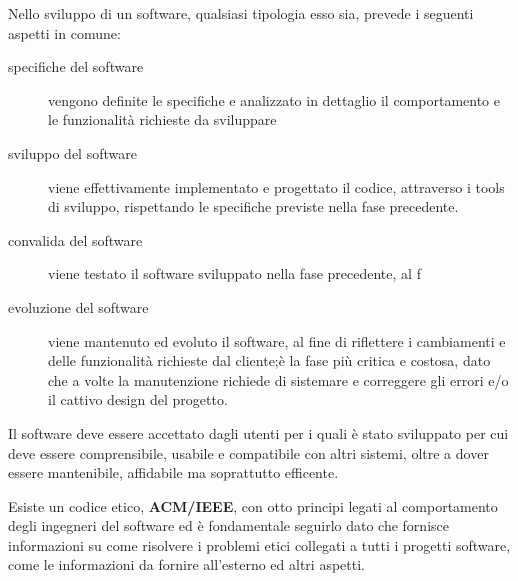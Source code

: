 \documentclass[a4paper,12pt, oneside]{book}
\begin{document}
Nello sviluppo di un software, qualsiasi tipologia esso sia, prevede i seguenti aspetti in comune:
\begin{description}
	\item [specifiche del software] vengono definite le specifiche e analizzato in dettaglio il comportamento
	      e le funzionalità richieste da sviluppare
	\item [sviluppo del software] viene effettivamente implementato e progettato il codice, attraverso i tools di sviluppo,
	      rispettando le specifiche previste nella fase precedente.
	\item [convalida del software] viene testato il software sviluppato nella fase precedente, al f
	\item [evoluzione del software] viene mantenuto ed evoluto il software, al fine di riflettere i cambiamenti e delle
	      funzionalità richieste dal cliente;è la fase più critica e costosa, dato che a volte la manutenzione richiede
	      di sistemare e correggere gli errori e/o il cattivo design del progetto.
\end{description}
Il software deve essere accettato dagli utenti per i quali è stato sviluppato per cui deve essere comprensibile,
usabile e compatibile con altri sistemi, oltre a dover essere mantenibile, affidabile ma soprattutto efficente.

Esiste un codice etico, \textbf{ACM/IEEE}, con otto principi legati al comportamento degli ingegneri del software
ed è fondamentale seguirlo dato che fornisce informazioni su come risolvere i problemi etici collegati
a tutti i progetti software, come le informazioni da fornire all'esterno ed altri aspetti.
\end{document}
